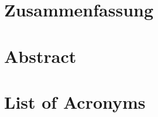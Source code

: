 \documentclass[headsepline,footsepline,12pt]{scrreprt}
\begin{document}



\newpage

\newpage

\chapter*{Zusammenfassung}

\newpage

\chapter*{Abstract}

\newpage

\tableofcontents
\newpage
\listoffigures
\newpage
\listoftables
\newpage



\chapter*{List of Acronyms}

\newpage









 



\newpage



\nocite{*}

\appendix

\newpage
\end{document}
